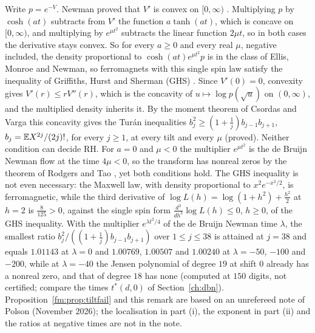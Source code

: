 \begin{remark}\label{fm:rem:blind}
Write $p=e^{-V}$. Newman proved that $V'$ is convex on $[0,\infty)$ \cite{Newman91}. Multiplying $p$ by $\cosh(at)$ subtracts from $V'$ the function $a\tanh(at)$, which is concave on $[0,\infty)$, and multiplying by $e^{\mu t^2}$ subtracts the linear function $2\mu t$, so in both cases the derivative stays convex. So for every $a\ge0$ and every real $\mu$, negative included, the density proportional to $\cosh(at)e^{\mu t^2}p$ is in the class of Ellis, Monroe and Newman, so ferromagnets with this single spin law satisfy the inequality of Griffiths, Hurst and Sherman (GHS) \cite{EMN76}. Since $V'(0)=0$, convexity gives $V'(r)\le rV''(r)$, which is the concavity of $u\mapsto\log p(\sqrt u)$ on $(0,\infty)$, and the multiplied density inherits it. By the moment theorem of Csordas and Varga \cite{CV88} this concavity gives the Tur\'an inequalities $b_j^2\ge(1+\frac1j)b_{j-1}b_{j+1}$, $b_j=\mathbb{E} X^{2j}/(2j)!$, for every $j\ge1$, at every tilt and every $\mu$ (proved). Neither condition can decide RH. For $a=0$ and $\mu<0$ the multiplier $e^{\mu t^2}$ is the de Bruijn Newman flow at the time $4\mu<0$, so the transform has nonreal zeros by the theorem of Rodgers and Tao \cite{RodgersTao}, yet both conditions hold. The GHS inequality is not even necessary: the Maxwell law, with density proportional to $x^2e^{-x^2/2}$, is ferromagnetic, while the third derivative of $\log L(h)=\log(1+h^2)+\frac{h^2}2$ at $h=2$ is $\frac8{125}>0$, against the single spin form $\frac{d^3}{dh^3}\log L(h)\le0$, $h\ge0$, of the GHS inequality. With the multiplier $e^{\lambda t^2/4}$ of the de Bruijn Newman time $\lambda$, the smallest ratio $b_j^2/((1+\frac1j)b_{j-1}b_{j+1})$ over $1\le j\le38$ is attained at $j=38$ and equals $1.01143$ at $\lambda=0$ and $1.00769$, $1.00507$ and $1.00240$ at $\lambda=-50$, $-100$ and $-200$, while at $\lambda=-40$ the Jensen polynomial of degree $19$ at shift $0$ already has a nonreal zero, and that of degree $18$ has none (computed at $150$ digits, not certified; compare the times $t^*(d,0)$ of Section~\ref{ch:dbn}). Proposition~\ref{fm:prop:tiltfail} and this remark are based on an unrefereed note of Polson (November 2026); the localisation in part (i), the exponent in part (ii) and the ratios at negative times are not in the note.
\end{remark}

